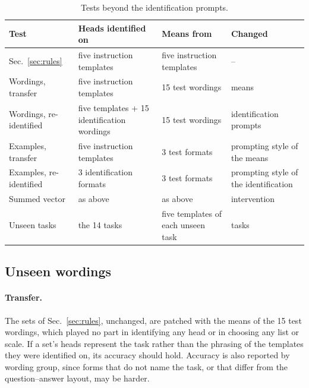 \documentclass[10pt,a4paper]{article}
\begin{document}
\begin{table}[tbp]
\centering\small
\begin{tabularx}{\textwidth}{@{}lLLl@{}}
\toprule
Test & Heads identified on & Means from & Changed \\
\midrule
Sec.~\ref{sec:rules} & five instruction templates & five instruction templates & -- \\
Wordings, transfer & five instruction templates & 15 test wordings & means \\
Wordings, re-identified & five templates + 15 identification wordings & 15 test wordings & identification prompts \\
Examples, transfer & five instruction templates & 3 test formats & prompting style of the means \\
Examples, re-identified & 3 identification formats & 3 test formats & prompting style of the identification \\
Summed vector & as above & as above & intervention \\
Unseen tasks & the 14 tasks & five templates of each unseen task & tasks \\
\bottomrule
\end{tabularx}
\caption{Tests beyond the identification prompts.}
\label{tab:scenarios}
\end{table}

\subsection{Unseen wordings}\label{sec:wordings}

\paragraph{Transfer.} The sets of Sec.~\ref{sec:rules}, unchanged, are patched with the means of the 15 test wordings, which played no part in identifying any head or in choosing any list or scale. If a set's heads represent the task rather than the phrasing of the templates they were identified on, its accuracy should hold. Accuracy is also reported by wording group, since forms that do not name the task, or that differ from the question--answer layout, may be harder.
\end{document}
